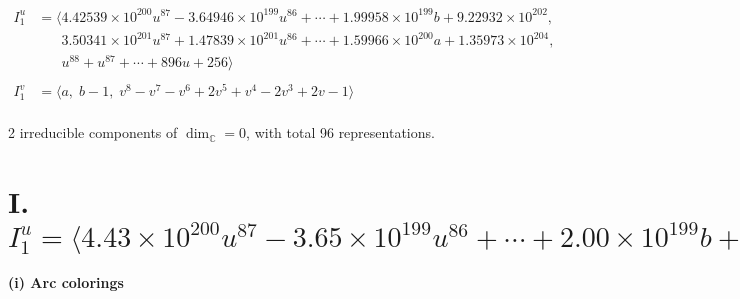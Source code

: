 \documentclass[1p]{elsarticle_modified}
\theoremstyle{definition}
\begin{document}
\begin{align*}
I^u_{1}&=\langle 
4.42539\times10^{200} u^{87}-3.64946\times10^{199} u^{86}+\cdots+1.99958\times10^{199} b+9.22932\times10^{202},\\
\phantom{I^u_{1}}&\phantom{= \langle  }3.50341\times10^{201} u^{87}+1.47839\times10^{201} u^{86}+\cdots+1.59966\times10^{200} a+1.35973\times10^{204},\\
\phantom{I^u_{1}}&\phantom{= \langle  }u^{88}+u^{87}+\cdots+896 u+256\rangle \\
\\
I^v_{1}&=\langle 
a,\;b-1,\;v^8- v^7- v^6+2 v^5+v^4-2 v^3+2 v-1\rangle \\
\end{align*}
\raggedright * 2 irreducible components of $\dim_{\mathbb{C}}=0$, with total 96 representations.\\
\newpage
\renewcommand{\arraystretch}{1}
\centering \section*{I. $I^u_{1}= \langle 4.43\times10^{200} u^{87}-3.65\times10^{199} u^{86}+\cdots+2.00\times10^{199} b+9.23\times10^{202},\;3.50\times10^{201} u^{87}+1.48\times10^{201} u^{86}+\cdots+1.60\times10^{200} a+1.36\times10^{204},\;u^{88}+u^{87}+\cdots+896 u+256 \rangle$}
\flushleft \textbf{(i) Arc colorings}\\
\end{document}
